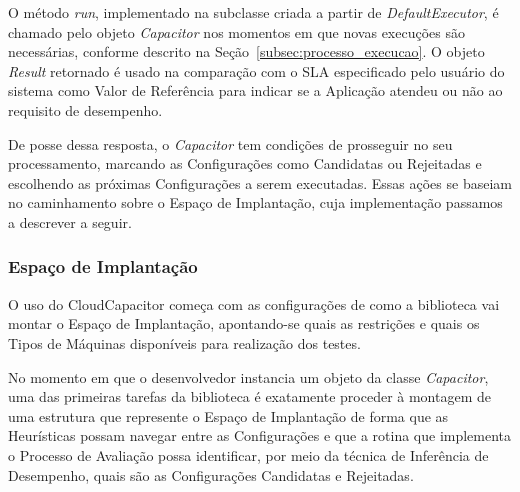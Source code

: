 O método \emph{run}, implementado na subclasse criada a partir de 
\emph{DefaultExecutor}, é chamado pelo objeto \emph{Capacitor} nos momentos em
que novas execuções são necessárias, conforme descrito na 
Seção~\ref{subsec:processo_execucao}. O objeto \emph{Result} retornado é usado
na comparação com o SLA especificado pelo usuário do sistema como Valor de
Referência para indicar se a Aplicação atendeu ou não ao requisito de desempenho.

De posse dessa resposta, o \emph{Capacitor} tem condições de prosseguir no seu
processamento, marcando as Configurações como Candidatas ou Rejeitadas e 
escolhendo as próximas Configurações a serem executadas. Essas ações se baseiam
no caminhamento sobre o Espaço de Implantação, cuja implementação passamos a
descrever a seguir.

\subsubsection{Espaço de Implantação}
\label{subsubsec:funcionamento_depspace}
O uso do CloudCapacitor começa com as configurações de como a 
biblioteca vai montar o Espaço de Implantação, apontando-se quais as restrições 
e quais os Tipos de Máquinas disponíveis para realização dos testes.

No momento em que o desenvolvedor instancia um objeto da classe \emph{Capacitor},
uma das primeiras tarefas da biblioteca é exatamente proceder à montagem de uma
estrutura que represente o Espaço de Implantação de forma que as Heurísticas
possam navegar entre as Configurações e que a rotina que implementa o Processo de
Avaliação possa identificar, por meio da técnica de Inferência de Desempenho, 
quais são as Configurações Candidatas e Rejeitadas. 

